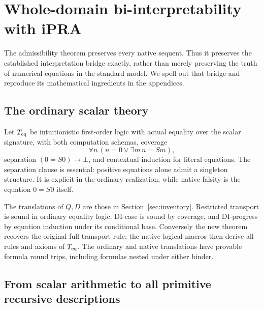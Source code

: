 \documentclass[11pt]{article}
\theoremstyle{definition}\newtheorem{definition}[theorem]{Definition}
\theoremstyle{remark}\newtheorem{remark}[theorem]{Remark}
\begin{document}
\section{Whole-domain bi-interpretability with iPRA}
\label{sec:bridge-overview}

The admissibility theorem preserves every native sequent. Thus it preserves
the established interpretation bridge exactly, rather than merely preserving
the truth of numerical equations in the standard model. We spell out that
bridge and reproduce its mathematical ingredients in the appendices.

\subsection{The ordinary scalar theory}

Let $T_{\rm eq}$ be intuitionistic first-order logic with actual equality over
the scalar signature, with both computation schemas, coverage
\[
 \forall n\,(n=0\lor\exists m\,n=Sm),
\]
separation $(0=S0)\to\bot$, and contextual induction for literal equations.
The separation clause is essential: positive equations alone admit a
singleton structure. It is explicit in the ordinary realization, while
native falsity is the equation $0=S0$ itself.

The translations of $Q,D$ are those in Section~\ref{sec:inventory}.
Restricted transport is sound in ordinary equality logic. DI-case is sound
by coverage, and DI-progress by equation induction under its conditional
base. Conversely the new theorem recovers the original full transport rule;
the native logical macros then derive all rules and axioms of $T_{\rm eq}$.
The ordinary and native translations have provable formula round trips,
including formulas nested under either binder.

\subsection{From scalar arithmetic to all primitive recursive descriptions}
\end{document}
